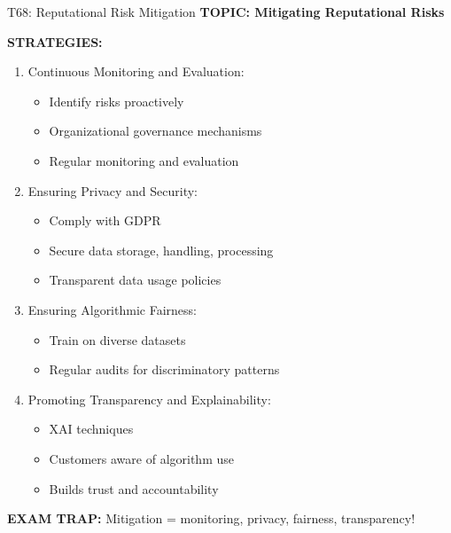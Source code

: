 \documentclass[8pt]{beamer}
\begin{document}
	\begin{frame}{T68: Reputational Risk Mitigation}
		\fontsize{6.5}{7.5}\selectfont
		\textbf{TOPIC: Mitigating Reputational Risks}
		
		\vspace{0.1cm}
		\textbf{STRATEGIES:}
		\begin{enumerate}
			\item \textcolor{myblue}{Continuous Monitoring and Evaluation:}
			\begin{itemize}
				\item Identify risks proactively
				\item Organizational governance mechanisms
				\item Regular monitoring and evaluation
			\end{itemize}
			
			\item \textcolor{myblue}{Ensuring Privacy and Security:}
			\begin{itemize}
				\item Comply with GDPR
				\item Secure data storage, handling, processing
				\item Transparent data usage policies
			\end{itemize}
			
			\item \textcolor{myblue}{Ensuring Algorithmic Fairness:}
			\begin{itemize}
				\item Train on diverse datasets
				\item Regular audits for discriminatory patterns
			\end{itemize}
			
			\item \textcolor{myblue}{Promoting Transparency and Explainability:}
			\begin{itemize}
				\item XAI techniques
				\item Customers aware of algorithm use
				\item Builds trust and accountability
			\end{itemize}
		\end{enumerate}
		
		\textcolor{myred}{\textbf{EXAM TRAP:}} Mitigation = \textcolor{myblue}{monitoring, privacy, fairness, transparency}!
	\end{frame}
	
\end{document}
